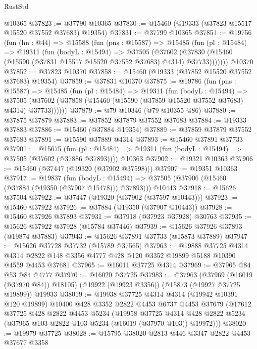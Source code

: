 \begin{lexlean}{RustStd}
\begin{coremodule}
    @10365
@37823 := @37790 @10365
@37830 := @15460 (@19333 (@37823 @15517 @15520 @37552 @37683) @19354)
@37831 := @37799 @10365
@37851 := @19756
    (fun (hn : @44) =>
    @15588
      (fun (pns : @15587) =>
      @15485
        (fun (pl : @15484) =>
        @19311
          (fun (bodyL : @15494) =>
          @37505
            (@37602
              (@37830 (@15460 (@15590 (@37831 @15517 @15520 @37552 @37683) @4314) @37733)))))))
    @10370
@37852 := @37823 @10370
@37858 := @15460 (@19333 (@37852 @15520 @37552 @37683) @19354)
@37859 := @37831 @10370
@37875 := @19786
    (fun (pns : @15587) =>
    @15485
      (fun (pl : @15484) =>
      @19311
        (fun (bodyL : @15494) =>
        @37505 (@37602 (@37858 (@15460 (@15590 (@37859 @15520 @37552 @37683) @4314) @37733))))))
@37879 := @79 @10346 (@79 @10355 @86)
@37880 := @37875 @37879
@37883 := @37852 @37879 @37552 @37683
@37884 := @19333 @37883
@37886 := @15460 (@37884 @19354)
@37889 := @37859 @37879 @37552 @37683
@37891 := @15590 @37889 @4314
@37893 := @15460 @37891 @37733
@37901 := @15675
    (fun (pl : @15484) => @19311 (fun (bodyL : @15494) => @37505 (@37602 (@37886 @37893))))
    @10363
@37902 := @19321 @10363
@37906 := @15460 (@37447 (@19320 (@37902 @37598)))
@37907 := @19351 @10363
@37917 := @19837
    (fun (bodyL : @15494) => @37505 (@37906 (@15460 (@37884 (@19350 (@37907 @15478))) @37893)))
    @10443
@37918 := @15626 @37504
@37922 := @37447 (@19320 (@37902 (@37597 @10443)))
@37923 := @15460 @37922
@37926 := @37884 (@19350 (@37907 @10443))
@37928 := @15460 @37926 @37893
@37931 := @37918 (@37923 @37928) @30763
@37935 := @15626 @37922 @37928 (@15784 @37446)
@37939 := @15626 @37926 @37893 (@19874 @37883)
@37943 := @15626 @37891 @37733 (@15873 @37889)
@37947 := @15626 @37728 @37732 (@15789 @37565)
@37963 := @19888
    @37725
    @4314
    @4314
    @2822
    @148
    @3356
    @4777
    @428
    @120
    @3352
    @19899
    @5188
    @10390
    @4559
    @4453
    @37681
@37965 := @16011 @37725 @4314
@37969 := @37965 @84 @53 @84 @4777
@37970 := @16020 @37725
@37983 := @37963
    (@37969 (@16019 (@37970 @84)) @18105)
    (@19922 (@19923 @3356))
    (@15873 (@19927 @37725 @19899))
    @19933
@38019 := @19938
    @37725
    @4314
    @4314
    (@19942 @10391 @120 @19899)
    @10400
    @428
    @3352
    @2822
    @4453
    @6737
    @4453
    @37679
    (@17612
      @37725
      @428
      @2822
      @4453
      @5234
      (@19958
        @37725
        @4314
        @428
        @2822
        @5234
        (@37965 @103 @2822 @103 @5234 (@16019 (@37970 @103)) @19972)))
@38020 := @19979 @37725
@38028 := @15795 @38020 @2813 @446 @3347 @2822 @4453 @37677 @3358

\end{coremodule}
\end{lexlean}
